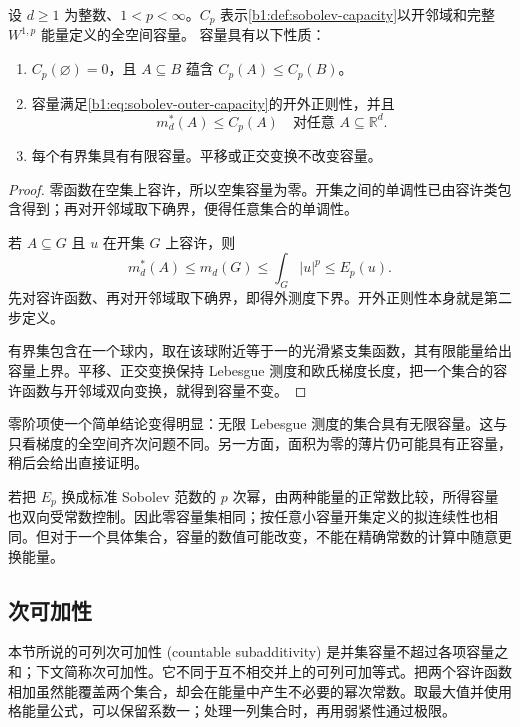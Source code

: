 \begin{proposition}\label{b1:prop:sobolev-capacity-basic}
设 \(d\geq1\) 为整数、\(1<p<\infty\)。\(C_p\) 表示\cref{b1:def:sobolev-capacity}以开邻域和完整 \(W^{1,p}\) 能量定义的全空间容量。
容量具有以下性质：
\begin{enumerate}
\item \(C_p(\varnothing)=0\)，且 \(A\subseteq B\) 蕴含 \(C_p(A)\le C_p(B)\)。
\item 容量满足\eqref{b1:eq:sobolev-outer-capacity}的开外正则性，并且
\[
 m_d^*(A)\le C_p(A)
 \quad\text{对任意 }A\subseteq\mathbb R^d.
\]
\item 每个有界集具有有限容量。平移或正交变换不改变容量。
\end{enumerate}
\end{proposition}
\begin{proof}
零函数在空集上容许，所以空集容量为零。开集之间的单调性已由容许类包含得到；再对开邻域取下确界，便得任意集合的单调性。

若 \(A\subseteq G\) 且 \(u\) 在开集 \(G\) 上容许，则
\[
 m_d^*(A)\le m_d(G)\le\int_G|u|^p
 \le E_p(u).
\]
先对容许函数、再对开邻域取下确界，即得外测度下界。开外正则性本身就是第二步定义。

有界集包含在一个球内，取在该球附近等于一的光滑紧支集函数，其有限能量给出容量上界。平移、正交变换保持 Lebesgue 测度和欧氏梯度长度，把一个集合的容许函数与开邻域双向变换，就得到容量不变。
\end{proof}

零阶项使一个简单结论变得明显：无限 Lebesgue 测度的集合具有无限容量。这与只看梯度的全空间齐次问题不同。另一方面，面积为零的薄片仍可能具有正容量，稍后会给出直接证明。

\ProseParagraphBreak

若把 \(E_p\) 换成标准 Sobolev 范数的 \(p\) 次幂，由两种能量的正常数比较，所得容量也双向受常数控制。因此零容量集相同；按任意小容量开集定义的拟连续性也相同。但对于一个具体集合，容量的数值可能改变，不能在精确常数的计算中随意更换能量。

\subsection{次可加性}
\label{b1:subsec:260103}

本节所说的可列次可加性 (countable subadditivity) 是并集容量不超过各项容量之和；下文简称次可加性。它不同于互不相交并上的可列可加等式。把两个容许函数相加虽然能覆盖两个集合，却会在能量中产生不必要的幂次常数。取最大值并使用格能量公式，可以保留系数一；处理一列集合时，再用弱紧性通过极限。

